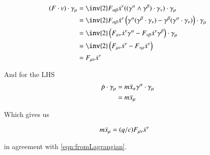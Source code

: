 \documentclass{article}
\begin{document}
\begin{align*}
(F \cdot v) \cdot \gamma_\mu 
&= \inv{2} F_{\alpha\beta} \xdot^\nu ((\gamma^{\alpha} \wedge \gamma^{\beta}) \cdot \gamma_\nu) \cdot \gamma_\mu \\
&= \inv{2} F_{\alpha\beta} \xdot^\nu \left( \gamma^{\alpha} (\gamma^{\beta} \cdot \gamma_\nu) -\gamma^{\beta} (\gamma^{\alpha} \cdot \gamma_\nu) \right) \cdot \gamma_\mu \\
&= \inv{2} \left( F_{\alpha\nu} \xdot^\nu \gamma^{\alpha} - F_{\nu\beta} \xdot^\nu \gamma^{\beta} \right) \cdot \gamma_\mu \\
&= \inv{2} \left( F_{\mu\nu} \xdot^\nu - F_{\nu\mu} \xdot^\nu \right) \\
&= F_{\mu\nu} \xdot^\nu \\
\end{align*}

And for the LHS
\begin{align*}
\dot{p} \cdot \gamma_\mu &= m \ddot{x}_\alpha \gamma^\alpha \cdot \gamma_\mu \\
&= m \ddot{x}_\mu 
\end{align*}

Which gives us

\begin{align}
m \ddot{x}_\mu &= (q/c) F_{\mu\nu} \dot{x}^\nu
\end{align}

in agreement with \ref{eqn:fromLagrangian}.



\end{document}
